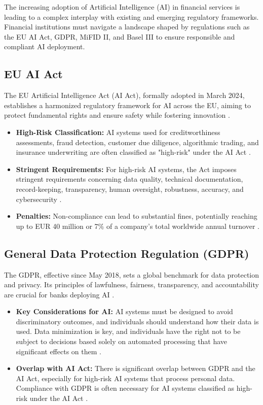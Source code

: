 The increasing adoption of Artificial Intelligence (AI) in financial services is leading to a complex interplay with existing and emerging regulatory frameworks. Financial institutions must navigate a landscape shaped by regulations such as the EU AI Act, GDPR, MiFID II, and Basel III to ensure responsible and compliant AI deployment.

\subsection{EU AI Act}
The EU Artificial Intelligence Act (AI Act), formally adopted in March 2024, establishes a harmonized regulatory framework for AI across the EU, aiming to protect fundamental rights and ensure safety while fostering innovation \cite{Eurofi_EU_AI_Act}.
\begin{itemize}
    \item \textbf{High-Risk Classification:} AI systems used for creditworthiness assessments, fraud detection, customer due diligence, algorithmic trading, and insurance underwriting are often classified as "high-risk" under the AI Act \cite{EY_EU_AI_Act, Deloitte_EU_AI_Act}.
    \item \textbf{Stringent Requirements:} For high-risk AI systems, the Act imposes stringent requirements concerning data quality, technical documentation, record-keeping, transparency, human oversight, robustness, accuracy, and cybersecurity \cite{Deloitte_EU_AI_Act}.
    \item \textbf{Penalties:} Non-compliance can lead to substantial fines, potentially reaching up to EUR 40 million or 7\% of a company's total worldwide annual turnover \cite{HoganLovells_EU_AI_Act}.
\end{itemize}

\subsection{General Data Protection Regulation (GDPR)}
The GDPR, effective since May 2018, sets a global benchmark for data protection and privacy. Its principles of lawfulness, fairness, transparency, and accountability are crucial for banks deploying AI \cite{UDIG_GDPR}.
\begin{itemize}
    \item \textbf{Key Considerations for AI:} AI systems must be designed to avoid discriminatory outcomes, and individuals should understand how their data is used. Data minimization is key, and individuals have the right not to be subject to decisions based solely on automated processing that have significant effects on them \cite{GDPRAdvisor_GDPR}.
    \item \textbf{Overlap with AI Act:} There is significant overlap between GDPR and the AI Act, especially for high-risk AI systems that process personal data. Compliance with GDPR is often necessary for AI systems classified as high-risk under the AI Act \cite{GrantThorntonNL_GDPR}.
\end{itemize}

